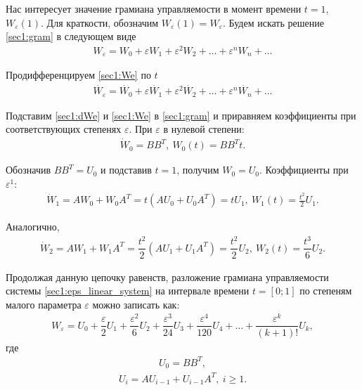 \documentclass[../main.tex]{subfiles}
\begin{document}
Нас интересует значение грамиана управляемости в момент времени $ t = 1$, $ W_{\varepsilon}(1) $.
Для краткости, обозначим $ W_{\varepsilon}(1) = W_{\varepsilon} $.
Будем искать решение \eqref{sec1:gram} в следующем виде
\begin{gather}\label{sec1:We}
    W_{\varepsilon} = W_0 + \varepsilon W_1 + \varepsilon^2 W_2 + \dots + \varepsilon^n W_n + \dots 
\end{gather}
 
Продифференцируем \eqref{sec1:We} по $ t $
\begin{gather}\label{sec1:dWe}
    \dot{W_{\varepsilon}} = \dot{W_0} + \varepsilon \dot{W_1} + \varepsilon^2 \dot{W_2} + \dots + \varepsilon^n \dot{W_n} + \dots 
\end{gather}
 
Подставим \eqref{sec1:dWe} и \eqref{sec1:We} в \eqref{sec1:gram} и приравняем коэффициенты при соответствующих степенях $ \varepsilon $.
При $ \varepsilon $ в нулевой степени:
\begin{gather*}
    \dot{W}_0 = B B ^T,  \ W_0(t) = B B ^Tt.
\end{gather*}
 
Обозначив $ B B^T = U_0 $ и подставив $ t = 1$, получим $ W_0 = U_0$.
Коэффициенты при $ \varepsilon ^ 1$:
\begin{gather*}
    \dot{W}_1 = A W_0 + W_0 A^T = t \left( A U_0 + U_0 A^T \right) = t U_1 ,  \ W_1(t) = \frac{t^2}{2}U_1.
\end{gather*}
 
Аналогично,
\begin{gather*}
    \dot{W}_2 = A W_1 + W_1 A^T = \dfrac{t^2}{2} \left( A U_1 + U_1 A^T \right) = \dfrac{t^2}{2} U_2 ,  \ W_2(t) = \dfrac{t^3}{6}U_2.
\end{gather*}
 
Продолжая данную цепочку равенств, разложение грамиана управляемости системы \eqref{sec1:eps_linear_system} на интервале времени $t = [0;1] $ по степеням малого параметра $ \varepsilon $ можно записать как:
\begin{gather}\label{sec1:gram1}
    W_{\varepsilon} = U_0 + \dfrac{\varepsilon}{2}U_1 + \dfrac{\varepsilon^2}{6} U_2 + \dfrac{\varepsilon^3}{24}U_3 + \dfrac{\varepsilon^4}{120}U_4 + \dots + \dfrac{\varepsilon^k}{(k+1)!}U_k,
\end{gather}
где
\begin{gather*}
    U_0 = B B^T,
\end{gather*}
\begin{gather*}
    U_i  = A U_{i-1} + U_{i-1} A^T, \ i \geq 1.
\end{gather*}
 
\end{document}
